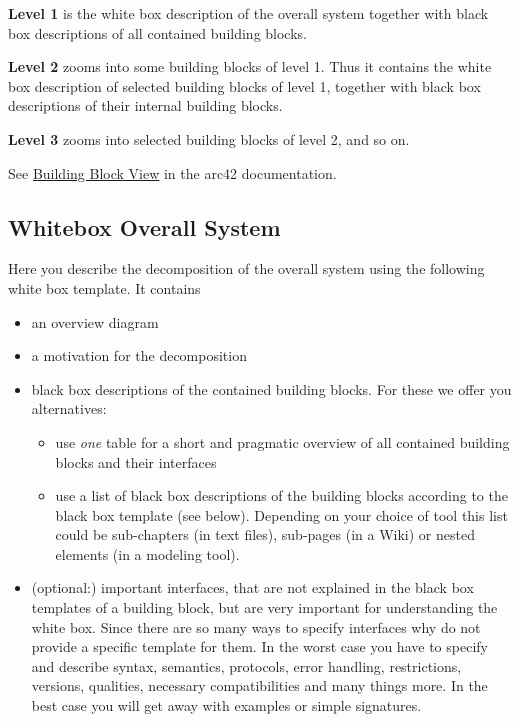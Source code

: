 \textbf{Level 1} is the white box description of the overall system
together with black box descriptions of all contained building blocks.

\textbf{Level 2} zooms into some building blocks of level 1. Thus it
contains the white box description of selected building blocks of level
1, together with black box descriptions of their internal building
blocks.

\textbf{Level 3} zooms into selected building blocks of level 2, and so
on.

See \href{https://docs.arc42.org/section-5/}{Building Block View} in the
arc42 documentation.

\hypertarget{_whitebox_overall_system}{%
\subsection{Whitebox Overall System}\label{_whitebox_overall_system}}

Here you describe the decomposition of the overall system using the
following white box template. It contains

\begin{itemize}
\item
  an overview diagram
\item
  a motivation for the decomposition
\item
  black box descriptions of the contained building blocks. For these we
  offer you alternatives:

  \begin{itemize}
  \item
    use \emph{one} table for a short and pragmatic overview of all
    contained building blocks and their interfaces
  \item
    use a list of black box descriptions of the building blocks
    according to the black box template (see below). Depending on your
    choice of tool this list could be sub-chapters (in text files),
    sub-pages (in a Wiki) or nested elements (in a modeling tool).
  \end{itemize}
\item
  (optional:) important interfaces, that are not explained in the black
  box templates of a building block, but are very important for
  understanding the white box. Since there are so many ways to specify
  interfaces why do not provide a specific template for them. In the
  worst case you have to specify and describe syntax, semantics,
  protocols, error handling, restrictions, versions, qualities,
  necessary compatibilities and many things more. In the best case you
  will get away with examples or simple signatures.
\end{itemize}

